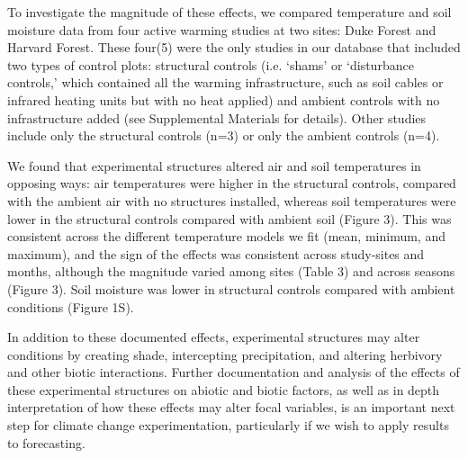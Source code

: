 \documentclass{article}
\begin{document}
\par To investigate the magnitude of these effects, we compared temperature and soil moisture data from four active warming studies at two sites: Duke Forest and Harvard Forest\citep{farnsworth1995,clark2014a, marchin2015, pelini2011}. These four(5) were the only studies in our database that included two types of control plots: structural controls (i.e. `shams' or `disturbance controls,' which contained all the warming infrastructure, such as soil cables or infrared heating units but with no heat applied) and ambient controls with no infrastructure added (see Supplemental Materials for details). Other studies include only the structural controls (n=3) or only the ambient controls (n=4).%


\par We found that experimental structures altered air and soil temperatures in opposing ways:  air temperatures were higher in the structural controls, compared with the ambient air with no structures installed, whereas soil temperatures were lower in the structural controls compared with ambient soil (Figure 3). This was consistent across the different temperature models we fit (mean, minimum, and maximum), and the sign of the effects was consistent across study-sites and months, although the magnitude varied among sites (Table 3) and across seasons (Figure 3). Soil moisture was lower in structural controls compared with ambient conditions (Figure 1S). 
\par In addition to these documented effects, experimental structures may alter conditions by creating shade, intercepting precipitation, and altering herbivory and other biotic interactions. Further documentation and analysis of the effects of these experimental structures on abiotic and biotic factors, as well as in depth interpretation of how these effects may alter focal variables, is an important next step for climate change experimentation, particularly if we wish to apply results to forecasting.
\end{document}
